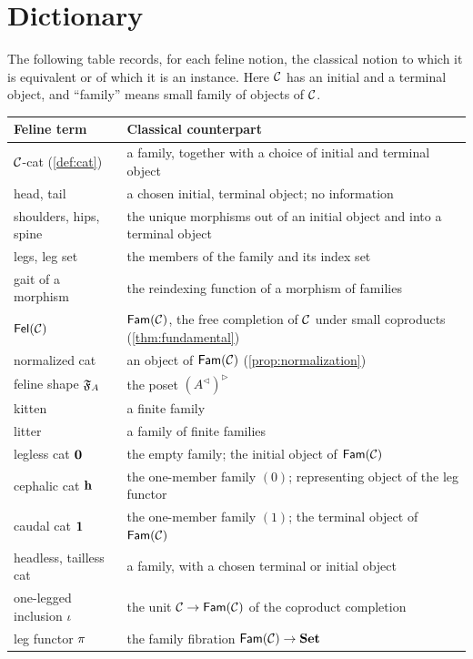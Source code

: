 \chapter{Dictionary}\label{app:dictionary}

The following table records, for each feline notion, the classical notion to
which it is equivalent or of which it is an instance. Here $\mathcal{C}$ has an initial
and a terminal object, and ``family'' means small family of objects of $\mathcal{C}$.

\medskip

{\small
\renewcommand{\arraystretch}{1.25}
\begin{longtable}{p{}p{}}
\textbf{Feline term} & \textbf{Classical counterpart}\\
\hline
\endhead
$\mathcal{C}$-cat (\cref{def:cat}) & a family, together with a choice of initial and terminal object\\
head, tail & a chosen initial, terminal object; no information\\
shoulders, hips, spine & the unique morphisms out of an initial object and into a terminal object\\
legs, leg set & the members of the family and its index set\\
gait of a morphism & the reindexing function of a morphism of families\\
$\mathsf{Fel}(\mathcal{C})$ & $\mathsf{Fam}(\mathcal{C})$, the free completion of $\mathcal{C}$ under small coproducts (\cref{thm:fundamental})\\
normalized cat & an object of $\mathsf{Fam}(\mathcal{C})$ (\cref{prop:normalization})\\
feline shape $\mathfrak{F}_A$ & the poset $(A^{\triangleleft})^{\triangleright}$\\
kitten & a finite family\\
litter & a family of finite families\\
legless cat $\mathbf{0}$ & the empty family; the initial object of $\mathsf{Fam}(\mathcal{C})$\\
cephalic cat $\mathbf{h}$ & the one-member family $(0)$; representing object of the leg functor\\
caudal cat $\mathbf{1}$ & the one-member family $(1)$; the terminal object of $\mathsf{Fam}(\mathcal{C})$\\
headless, tailless cat & a family, with a chosen terminal or initial object\\
one-legged inclusion $\iota$ & the unit $\mathcal{C}\to\mathsf{Fam}(\mathcal{C})$ of the coproduct completion\\
leg functor $\pi$ & the family fibration $\mathsf{Fam}(\mathcal{C})\to\mathbf{Set}$\\

\end{longtable}}
